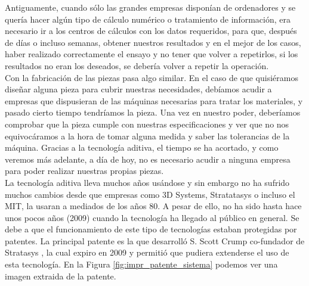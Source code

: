 Antiguamente, cuando sólo las grandes empresas disponían de ordenadores y se quería hacer algún tipo de cálculo numérico o tratamiento de información, era necesario ir a los centros de cálculos con los datos requeridos, para que, después de días o incluso semanas, obtener nuestros resultados y en el mejor de los casos, haber realizado correctamente el ensayo y no tener que volver a repetirlos, si los resultados no eran los deseados, se debería volver a repetir la operación.\\

Con la fabricación de las piezas pasa algo similar. En el caso de que quisiéramos diseñar alguna pieza para cubrir nuestras necesidades, debíamos acudir a empresas que dispusieran de las máquinas necesarias para tratar los materiales, y pasado cierto tiempo tendríamos la pieza. Una vez en nuestro poder, deberíamos comprobar que la pieza cumple con nuestras especificaciones y ver que no nos equivocáramos a la hora de tomar alguna medida y saber las tolerancias de la máquina. Gracias a la tecnología aditiva, el tiempo se ha acortado, y como veremos más adelante, a día de hoy, no es necesario acudir a ninguna empresa para poder realizar nuestras propias piezas.\\

La tecnología aditiva lleva muchos años usándose y sin embargo no ha sufrido muchos cambios desde que empresas como 3D Systems, Stratatasys o incluso el MIT, la usaran a mediados de los años 80. A pesar de ello, no ha sido hasta hace unos pocos años (2009) cuando la tecnología ha llegado al público en general. Se debe a que el funcionamiento de este tipo de tecnologías estaban protegidas por patentes. La principal patente es la que desarrolló S. Scott Crump co-fundador de Stratasys \cite{crump1992apparatus}, la cual expiro en 2009 y permitió que pudiera extenderse el uso de esta tecnología. En la Figura \ref{fig:impr_patente_sistema} podemos ver una imagen extraida de la patente.\\

